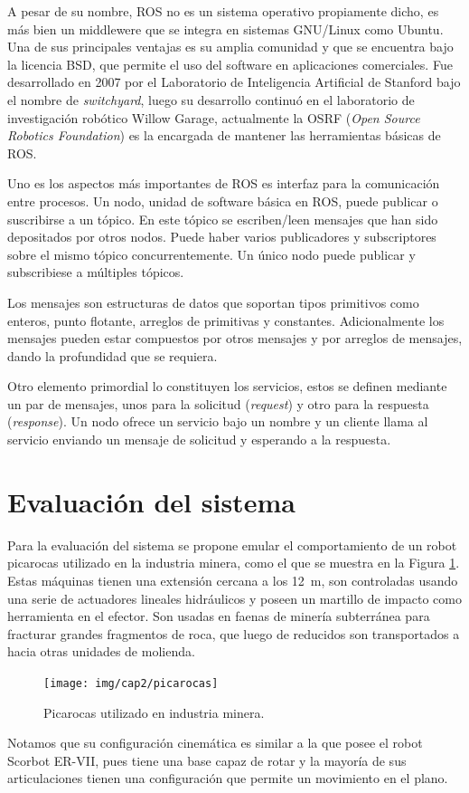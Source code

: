 A pesar de su nombre, ROS no es un sistema operativo propiamente dicho, es más bien un middlewere que se integra en sistemas GNU/Linux como Ubuntu. Una de sus principales ventajas es su amplia comunidad y que se encuentra bajo la licencia BSD, que permite el uso del software en aplicaciones comerciales. Fue desarrollado en 2007 por el Laboratorio de Inteligencia Artificial de Stanford bajo el nombre de \textit{switchyard}, luego su desarrollo continuó en el laboratorio de investigación robótico Willow Garage, actualmente la OSRF (\textit{Open Source Robotics Foundation}) es la encargada de mantener las herramientas básicas de ROS.

Uno es los aspectos más importantes de ROS es interfaz para la comunicación entre procesos. Un nodo, unidad de software básica en ROS, puede publicar o suscribirse a un tópico. En este tópico se escriben/leen mensajes que han sido depositados por otros nodos. Puede haber varios publicadores y subscriptores sobre el mismo tópico concurrentemente. Un único nodo puede publicar y subscribiese a múltiples tópicos.

Los mensajes son estructuras de datos que soportan tipos primitivos como
enteros, punto flotante, arreglos de primitivas y constantes. Adicionalmente los mensajes pueden estar compuestos por otros mensajes y por arreglos de mensajes, dando la profundidad que se requiera.

Otro elemento primordial lo constituyen los servicios, estos se definen mediante un par de mensajes, unos para la solicitud (\textit{request}) y otro para la respuesta (\textit{response}). Un nodo ofrece un servicio bajo un nombre y un cliente llama al servicio enviando un mensaje de solicitud y esperando a la respuesta.

\section{Evaluación del sistema}

Para la evaluación del sistema se propone emular el comportamiento de un robot picarocas utilizado en la industria minera, como el que se muestra en la Figura \ref{cap2_picarocas}. Estas máquinas tienen una extensión cercana a los \SI{12}{\meter}, son controladas usando una serie de actuadores lineales hidráulicos y poseen un martillo de impacto como herramienta  en el efector. Son usadas en faenas de minería subterránea para fracturar grandes fragmentos de roca, que luego de reducidos son transportados a hacia otras unidades de molienda.

\begin{figure}[ht]
  \centering
  \texttt{[image: img/cap2/picarocas]}
  \caption{Picarocas utilizado en industria minera.}
  \label{cap2_picarocas}
\end{figure}

Notamos que su configuración cinemática es similar a la que posee el robot Scorbot ER-VII, pues tiene una base capaz de rotar y la mayoría de sus articulaciones tienen una configuración que permite un movimiento en el plano.

